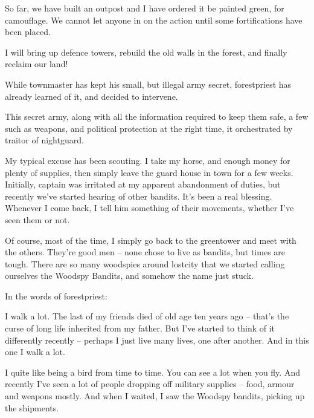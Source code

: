 \begin{multicols}{2}
\begin{exampletext}
  So far, we have built an outpost and I have ordered it be painted green, for camouflage.
  We cannot let anyone in on the action until some fortifications have been placed.
  
  I will bring up defence towers, rebuild the old walls in the forest, and finally reclaim our land!

\end{exampletext}

While \gls{townmaster} has kept his small, but illegal army secret, \gls{forestpriest} has already learned of it, and decided to intervene.

This secret army, along with all the information required to keep them safe, a few such as weapons, and political protection at the right time, it orchestrated by \gls{traitor} of \gls{nightguard}.

\begin{exampletext}

  My typical excuse has been scouting.
  I take my horse, and enough money for plenty of supplies, then simply leave the guard house in \gls{town} for a few weeks.
  Initially, \gls{captain} was irritated at my apparent abandonment of duties, but recently we've started hearing of other bandits.
  It's been a real blessing.
  Whenever I come back, I tell him something of their movements, whether I've seen them or not.

  Of course, most of the time, I simply go back to the \gls{greentower} and meet with the others.
  They're good men -- none chose to live as bandits, but times are tough.
  There are so many woodspies around \gls{lostcity} that we started calling ourselves the Woodspy Bandits, and somehow the name just stuck.

\end{exampletext}

In the words of \gls{forestpriest}:

\begin{exampletext}

  I walk a lot.
  The last of my friends died of old age ten years ago -- that's the curse of long life inherited from my father.
  But I've started to think of it differently recently -- perhaps I just live many lives, one after another.
  And in this one I walk a lot.

  I quite like being a bird from time to time.
  You can see a lot when you fly.
  And recently I've seen a lot of people dropping off military supplies -- food, armour and weapons mostly.
  And when I waited, I saw the Woodspy bandits, picking up the shipments.
  

\end{exampletext}
\end{multicols}

